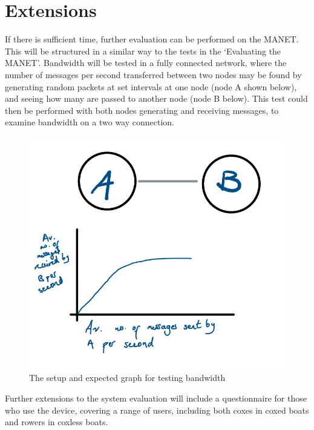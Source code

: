\documentclass[10pt, a4paper]{article}
\begin{document}
\section*{Extensions}
If there is sufficient time, further evaluation can be performed on the MANET. This will be structured in a similar way to the tests in the `Evaluating the MANET'. Bandwidth will be tested in a fully connected network, where the number of messages per second transferred between two nodes may be found by generating random packets at set intervals at one node (node A shown below), and seeing how many are passed to another node (node B below). 
This test could then be performed with both nodes generating and receiving messages, to examine bandwidth on a two way connection.\\
\begin{figure}[h]
\caption{The setup and expected graph for testing bandwidth}
\begin{center}
\includegraphics[scale=0.3]{bandwidth.jpg}
\end{center}
\end{figure}

Further extensions to the system evaluation will include a questionnaire for those who use the device, covering a range of users, including both coxes in coxed boats and rowers in coxless boats. \\ 

\FloatBarrier
\vspace{10px}
\end{document}
